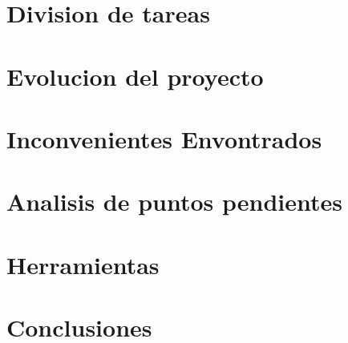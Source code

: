 


		
	
	\newpage

	\tableofcontents
	\newpage

	\graphicspath{{../docs/report/pics/}}

	\section{Division de tareas}
		

	\newpage
	\section{Evolucion del proyecto}
		

	\newpage
	\section{Inconvenientes Envontrados}
		

	\newpage
	\section{Analisis de puntos pendientes}
		

	\newpage
    \section{Herramientas}
        

	\newpage
	\section{Conclusiones}
		

